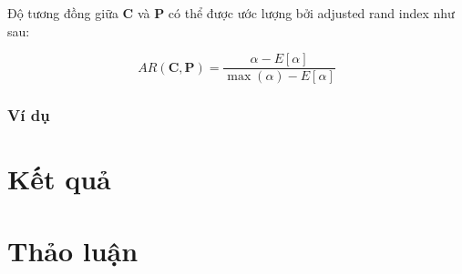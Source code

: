 Độ tương đồng giữa $\textbf{C}$ và $\textbf{P}$ có thể được ước lượng bởi adjusted rand index như sau:
\begin{center}
\begin{equation}
AR(\textbf{C}, \textbf{P}) = \frac{\alpha - E[\alpha]}{\max(\alpha) - E[\alpha]}
\end{equation}
\end{center}

\subsubsection{Ví dụ}

\section{Kết quả}

\section{Thảo luận}



